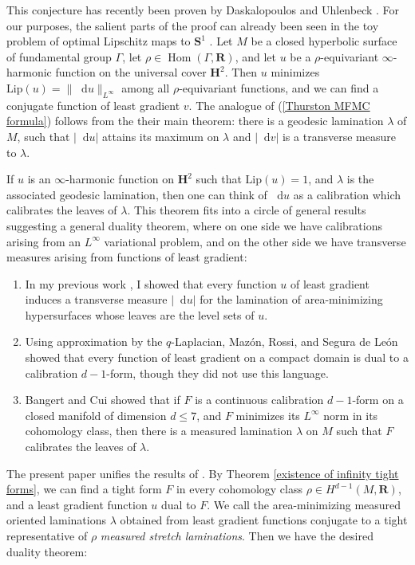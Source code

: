 \documentclass[reqno,11pt]{amsart}
\newcommand{\RR}{\mathbf{R}}
\newcommand{\Hyp}{\mathbf H}
\newcommand{\Sph}{\mathbf S}
\newcommand*\dif{\mathop{}\!\mathrm{d}}
\DeclareMathOperator{\Hom}{Hom}
\newcommand{\Lip}{\mathrm{Lip}}
\newcommand{\dfn}[1]{\emph{#1}\index{#1}}
\theoremstyle{definition}
\numberwithin{equation}{section}
\begin{document}
This conjecture has recently been proven by Daskalopoulos and Uhlenbeck \cite{daskalopoulos2022,uhlenbeck2023noether,daskalopoulos2023}.
For our purposes, the salient parts of the proof can already been seen in the toy problem of optimal Lipschitz maps to $\Sph^1$ \cite{daskalopoulos2020transverse}.
Let $M$ be a closed hyperbolic surface of fundamental group $\Gamma$, let $\rho \in \Hom(\Gamma, \RR)$, and let $u$ be a $\rho$-equivariant $\infty$-harmonic function on the universal cover $\Hyp^2$.
Then $u$ minimizes $\Lip(u) = \|\dif u\|_{L^\infty}$ among all $\rho$-equivariant functions, and we can find a conjugate function of least gradient $v$.
The analogue of (\ref{Thurston MFMC formula}) follows from the their main theorem: there is a geodesic lamination $\lambda$ of $M$, such that $|\dif u|$ attains its maximum on $\lambda$ and $|\dif v|$ is a transverse measure to $\lambda$.

If $u$ is an $\infty$-harmonic function on $\Hyp^2$ such that $\Lip(u) = 1$, and $\lambda$ is the associated geodesic lamination, then one can think of $\dif u$ as a calibration which calibrates the leaves of $\lambda$.
This theorem fits into a circle of general results suggesting a general duality theorem, where on one side we have calibrations arising from an $L^\infty$ variational problem, and on the other side we have transverse measures arising from functions of least gradient:
\begin{enumerate}
\item In my previous work \cite{BackusCML}, I showed that every function $u$ of least gradient induces a transverse measure $|\dif u|$ for the lamination of area-minimizing hypersurfaces whose leaves are the level sets of $u$.
\item Using approximation by the $q$-Laplacian, Maz\'on, Rossi, and Segura de Le\'on \cite{Mazon14} showed that every function of least gradient on a compact domain is dual to a calibration $d - 1$-form, though they did not use this language.
\item Bangert and Cui \cite{bangert_cui_2017} showed that if $F$ is a continuous calibration $d - 1$-form on a closed manifold of dimension $d \leq 7$, and $F$ minimizes its $L^\infty$ norm in its cohomology class, then there is a measured lamination $\lambda$ on $M$ such that $F$ calibrates the leaves of $\lambda$.
\end{enumerate}

The present paper unifies the results of \cite{daskalopoulos2020transverse,bangert_cui_2017}.
By Theorem \ref{existence of infinity tight forms}, we can find a tight form $F$ in every cohomology class $\rho \in H^{d - 1}(M, \RR)$, and a least gradient function $u$ dual to $F$.
We call the area-minimizing measured oriented laminations $\lambda$ obtained from least gradient functions conjugate to a tight representative of $\rho$ \dfn{measured stretch laminations}.
Then we have the desired duality theorem:
\end{document}
